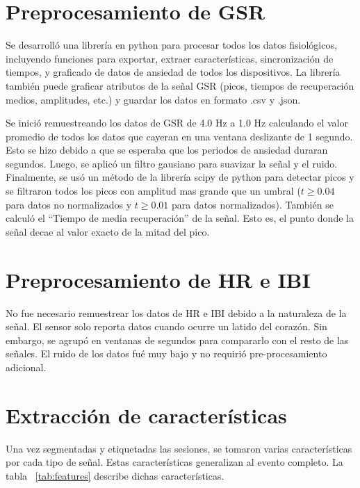 \section{Preprocesamiento de GSR}\label{secc:gsrpreprocessing}
Se desarroll\'o una librer\'ia en python para procesar todos los datos fisiol\'ogicos, incluyendo funciones para exportar, extraer caracter\'isticas, sincronizaci\'on de tiempos, y graficado de datos de ansiedad de todos los dispositivos. La librer\'ia tambi\'en puede graficar atributos de la se\~nal GSR (picos, tiempos de recuperaci\'on medios, amplitudes, etc.) y guardar los datos en formato .csv y .json.

Se inici\'o remuestreando los datos de GSR de 4.0 Hz a 1.0 Hz calculando el valor promedio de todos los datos que cayeran en una ventana deslizante de 1 segundo. Esto se hizo debido a que se esperaba que los periodos de ansiedad duraran segundos. Luego, se aplic\'o un filtro gausiano para suavizar la se\~nal y el ruido. Finalmente, se us\'o un m\'etodo de la librer\'ia scipy de python para detectar picos y se filtraron todos los picos con amplitud mas grande que un umbral ($t \geqslant 0.04$ para datos no normalizados y $t \geqslant 0.01$ para datos normalizados). Tambi\'en se calcul\'o el ``Tiempo de media recuperaci\'on'' de la se\~nal. Esto es, el punto donde la se\~nal decae al valor exacto de la mitad del pico.
\section{Preprocesamiento de HR e IBI}\label{secc:hribipreprocessing}
No fue necesario remuestrear los datos de HR e IBI debido a la naturaleza de la se\~nal. El sensor solo reporta datos cuando ocurre un latido del coraz\'on. Sin embargo, se agrup\'o en ventanas de segundos para compararlo con el resto de las se\~nales. El ruido de los datos fu\'e muy bajo y no requiri\'o pre-procesamiento adicional.
\section{Extracci\'on de caracter\'isticas}
Una vez segmentadas y etiquetadas las sesiones, se tomaron varias caracter\'isticas por cada tipo de se\~nal. Estas caracter\'isticas generalizan al evento completo. La tabla ~\ref{tab:features} describe dichas caracter\'isticas.

